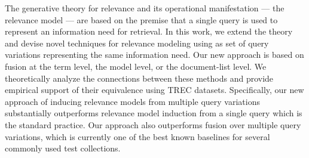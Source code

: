 The generative theory for relevance and its operational manifestation
--- the relevance model --- are based on the premise that a single
query is used to represent an information need for retrieval.
In this work, we extend the theory and devise novel techniques for
relevance modeling using as set of query variations representing the
same information need.
Our new approach is based on fusion at the term level, the model
level, or the document-list level.
We theoretically analyze the connections between these methods and
provide empirical support of their equivalence using TREC datasets.
Specifically, our new approach of inducing relevance models from
multiple query variations substantially outperforms relevance model
induction from a single query which is the standard practice.
Our approach also outperforms fusion over multiple query variations,
which is currently one of the best known baselines for several
commonly used test collections.

